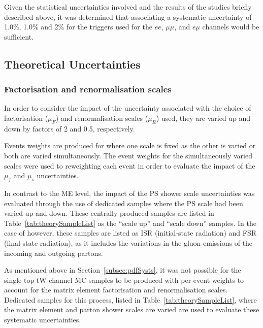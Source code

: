 Given the statistical uncertainties involved and the results of the studies briefly described above, it was determined that associating a systematic uncertainty of 1.0\%, 1.0\% and 2\% for the triggers used for the $ee$, $\mu\mu$, and $e \mu$ channels would be sufficient.

\subsection{Theoretical Uncertainties}\label{sec:theorySysts}
\subsubsection{Factorisation and renormalisation scales}
In order to consider the impact of the uncertainty associated with the choice of factorisation ($\mu_{F}$) and renormalisation scales ($\mu_{R}$) used, they are varied up and down by factors of 2 and 0.5, respectively.



Events weights are produced for where one scale is fixed as the other is varied or both are varied simultaneously.
The event weights for the simultaneously varied scales were used to reweighting each event in order to evaluate the impact of the $\mu_{f}$ and $\mu_{s}$ uncertainties.

In contrast to the ME level, the impact of the PS shower scale uncertainties was evaluated through the use of dedicated samples where the PS scale had been varied up and down.
These centrally produced samples are listed in Table~\ref{tab:theorySampleList} as the ``scale up'' and ``scale down'' samples.
In the case of \ttbar however, these samples are listed as ISR (initial-state radiation) and FSR (final-state radiation), as it includes the variations in the gluon emissions of the incoming and outgoing partons.

As mentioned above in Section~\ref{subsec:pdfSysts}, it was not possible for the single top tW-channel MC samples to be produced with per-event weights to account for the matrix element factorisation and renormalisation scales.
Dedicated samples for this process, listed in Table~\ref{tab:theorySampleList}, where the matrix element and parton shower scales are varied are used to evaluate these systematic uncertainties.

